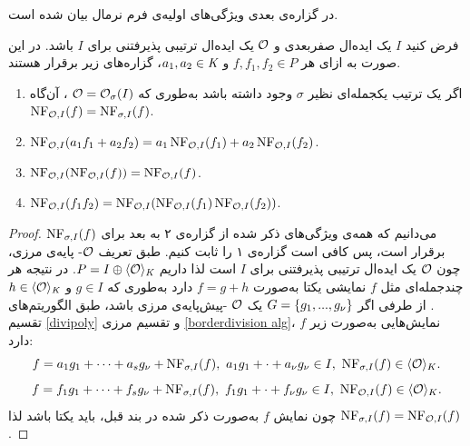 در گزاره‌ی  بعدی ویژگی‌های اولیه‌ی فرم نرمال بیان شده است.
\begin{proposition}
فرض کنید 
$I$
یک ایده‌ال صفربعدی و 
${\mathcal O}$
یک ایده‌ال ترتیبی پذیرفتنی برای 
$I$
باشد. در این صورت به ازای هر 
$f,f_{1},f_{2}\in P$
و
$a_{1},a_{2}\in\textit{K}$،
 گزاره‌های زیر برقرار هستند.
\begin{enumerate}
\item
اگر یک ترتیب یکجمله‌ای نظیر 
$\sigma$
وجود داشته باشد به‌طوری که 
${\mathcal O} = {\mathcal O}_{\sigma}(I)$
، آن‌گاه 
$\operatorname{\mathrm{NF}}_{{\mathcal O}, I}(f) = \operatorname{\mathrm{NF}}_{\sigma, I}(f)$.
\item
$\operatorname{\mathrm{NF}}_{{\mathcal O},I}(a_{1}f_{1} + a_{2}f_{2}) = a_{1}\operatorname{\mathrm{NF}}_{{\mathcal O},I}(f_{1}) + a_{2}\operatorname{\mathrm{NF}}_{{\mathcal O},I}(f_{2})$.
\item
$\operatorname{\mathrm{NF}}_{{\mathcal O},I}(\operatorname{\mathrm{NF}}_{{\mathcal O},I}(f)) = \operatorname{\mathrm{NF}}_{{\mathcal O},I}(f)$.
\item
$\operatorname{\mathrm{NF}}_{{\mathcal O},I}(f_{1}f_{2}) = \operatorname{\mathrm{NF}}_{{\mathcal O}, I}(\operatorname{\mathrm{NF}}_{{\mathcal O},I}(f_{1})\operatorname{\mathrm{NF}}_{{\mathcal O},I}(f_{2}))$.
\end{enumerate}
\end{proposition}
\begin{proof}
می‌دانیم که همه‌ی ویژگی‌های ذکر شده از گزاره‌ی ۲ به بعد برای 
$\operatorname{\mathrm{NF}}_{\sigma,I}(f)$
برقرار است، پس کافی است گزاره‌ی ۱ را ثابت کنیم. طبق تعریف 
${\mathcal O}$-
پایه‌ی مرزی، چون
${\mathcal O}$
یک ایده‌ال ترتیبی پذیرفتنی برای 
$I$
است لذا داریم 
$P = I\oplus \langle {\mathcal O}\rangle_{\textit{K}}$.
در نتیجه هر چند‌جمله‌‌ای مثل 
$f$
نمایشی یکتا به‌صورت 
$f = g + h$
دارد به‌طوری که 
$g\in I$
و
$h\in \langle{\mathcal O}\rangle_{\textit{K}}$.
از طرفی اگر 
$G = \{g_{1},...,g_{\nu}\}$
یک 
${\mathcal O}$
-پیش‌پایه‌ی مرزی باشد، طبق الگوریتم‌های تقسیم 
\ref{divipoly}
و تقسیم مرزی
\ref{borderdivision alg}،
$f$
نمایش‌هایی به‌صورت زیر دارد:
$$f = a_{1}g_{1}+\cdots + a_{s}g_{\nu} + \nf_{\sigma, I}(f), \ a_{1}g_{1}+\cdot +a_{\nu}g_{\nu}\in I, \ \nf_{\sigma, I}(f)\in \langle  \mO\rangle_{K}.$$
$$f = f_{1}g_{1}+\cdots + f_{s}g_{\nu} + \nf_{\sigma, I}(f), \ f_{1}g_{1}+\cdot +f_{\nu}g_{\nu}\in I, \ \nf_{\mO, I}(f)\in \langle  \mO\rangle_{K}.$$
چون نمایش 
$f$
به‌صورت ذکر شده در بند قبل، باید یکتا باشد لذا 
$\operatorname{\mathrm{NF}}_{\sigma,I}(f) = \operatorname{\mathrm{NF}}_{{\mathcal O}, I}(f)$.
\end{proof}

